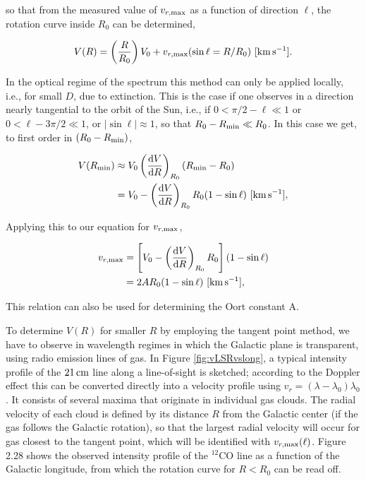 \documentclass[a4paper,10pt]{article}
\begin{document}
{\noindent}so that from the measured value of $v_{r,{\rm max}}$ as a function of direction $\ell$, the rotation curve inside $R_0$ can be determined,

\begin{align*}
    V(R) = \left(\frac{R}{R_0}\right)V_0 + v_{r,{\rm max}}(\sin\ell=R/R_0) ~ [{\rm km\,s^{-1}}].
\end{align*}

{\noindent}In the optical regime of the spectrum this method can only be applied locally, i.e., for small $D$, due to extinction. This is the case if one observes in a direction nearly tangential to the orbit of the Sun, i.e., if $0<\pi/2-\ell\ll1$ or $0<\ell-3\pi/2\ll1$, or $\lvert\sin\ell\rvert\approx1$, so that $R_0-R_{\rm min}\ll R_0$. In this case we get, to first order in $(R_0-R_{\rm min})$,

\begin{align}
    V(R_{\rm min}) &\approx V_0 \left(\frac{{\rm d}V}{{\rm d}R}\right)_{R_0}(R_{\rm min}-R_0) \\
    &= V_0 - \left(\frac{{\rm d}V}{{\rm d}R}\right)_{R_0} R_0(1-\sin\ell) ~ [{\rm km\,s^{-1}}],
\end{align}

{\noindent}Applying this to our equation for $v_{r,{\rm max}}$,

\begin{align*}
    v_{r,{\rm max}} &= \left[V_0-\left(\frac{{\rm d}V}{{\rm d}R}\right)_{R_0}R_0\right](1-\sin\ell) \\
    &= 2AR_0(1-\sin\ell) ~ [{\rm km\,s^{-1}}],
\end{align*}

{\noindent}This relation can also be used for determining the Oort constant A.

{\noindent}To determine $V(R)$ for smaller $R$ by employing the tangent point method, we have to observe in wavelength regimes in which the Galactic plane is transparent, using radio emission lines of gas. In Figure \ref{fig:vLSRvslong}, a typical intensity profile of the $21\,{\rm cm}$ line along a line-of-sight is sketched; according to the Doppler effect this can be converted directly into a velocity profile using $v_r=(\lambda-\lambda_0)\lambda_0$. It consists of several maxima that originate in individual gas clouds. The radial velocity of each cloud is defined by its distance $R$ from the Galactic center (if the gas follows the Galactic rotation), so that the largest radial velocity will occur for gas closest to the tangent point, which will be identified with $v_{r,{\rm max}}(\ell)$. Figure 2.28 shows the observed intensity profile of the $^{12}$CO line as a function of the Galactic longitude, from which the rotation curve for $R<R_0$ can be read off.
\end{document}
